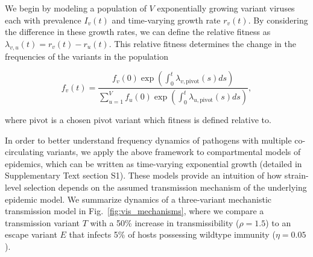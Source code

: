 \documentclass[11pt,oneside,letterpaper]{article}
\newcommand{\varEscape}{\eta}
\newcommand{\varTransmission}{\rho}
\begin{document}
We begin by modeling a population of $V$ exponentially growing variant viruses each with prevalence $I_v(t)$ and time-varying growth rate $r_v(t)$.
By considering the difference in these growth rates, we can define the relative fitness as $\lambda_{v, u}(t) = r_v(t) - r_u(t)$.
This relative fitness determines the change in the frequencies of the variants in the population

\begin{equation}
    f_v(t) = \frac{f_v(0) \exp \left( \int_0^t \lambda_{v, \text{pivot}}(s)ds \right)}{ \sum_{u=1}^{V} f_u(0) \exp \left( \int_0^t \lambda_{u, \text{pivot}}(s)ds \right)},
\end{equation}

where $\text{pivot}$ is a chosen pivot variant which fitness is defined relative to.

In order to better understand frequency dynamics of pathogens with multiple co-circulating variants, we apply the above framework to compartmental models of epidemics, which can be written as time-varying exponential growth (detailed in Supplementary Text section S1).
These models provide an intuition of how strain-level selection depends on the assumed transmission mechanism of the underlying epidemic model.
We summarize dynamics of a three-variant mechanistic transmission model in Fig.~\ref{fig:vis_mechanisms}, where we compare a transmission variant $T$ with a 50\% increase in transmissibility ($\varTransmission=1.5$) to an escape variant $E$ that infects 5\% of hosts possessing wildtype immunity ($\varEscape=0.05$).
\end{document}
